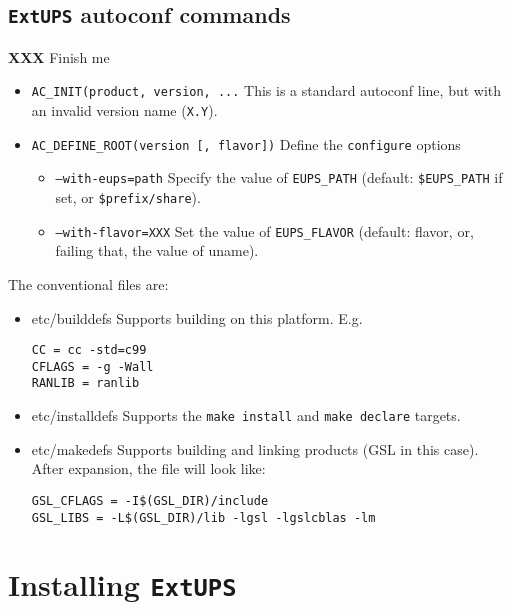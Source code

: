 \documentclass{article}
\newcommand{\XXX}[1]{\textbf{XXX} #1}
\newcommand{\code}[1]{\texttt{#1}}
\newcommand{\eups}{\code{ExtUPS}}
\begin{document}
\subsection{\eups{} autoconf commands}
\label{autoconfReference}

\XXX{Finish me}

\begin{itemize}
  \item{\code{AC\_INIT(product, version, ...}}
    This is a standard autoconf line, but with an invalid version name (\code{X.Y}).

  \item{\code{AC\_DEFINE\_ROOT(version [, flavor])}}
    Define the \code{configure} options
    \begin{itemize}
      \item{\code{--with-eups=path}}
        Specify the value of \code{EUPS\_PATH}
        (default: \code{\$EUPS\_PATH} if set, or \code{\$prefix/share}).
      \item{\code{--with-flavor=XXX}}
        Set the value of \code{EUPS\_FLAVOR}
        (default: flavor, or, failing that, the value of uname).
    \end{itemize}
\end{itemize}

The conventional files are:
\begin{itemize}
   \item{etc/builddefs}
     Supports building on this platform. E.g.
\begin{verbatim}
CC = cc -std=c99
CFLAGS = -g -Wall
RANLIB = ranlib
\end{verbatim}
  
   \item{etc/installdefs}
     Supports the \code{make install} and \code{make declare} targets.
  
   \item{etc/makedefs}
     Supports building and linking products (GSL in this case). After
     expansion, the file will look like:
\begin{verbatim}
GSL_CFLAGS = -I$(GSL_DIR)/include
GSL_LIBS = -L$(GSL_DIR)/lib -lgsl -lgslcblas -lm
\end{verbatim}
\end{itemize}
  
\section{Installing \eups{}}
  
\end{document}

